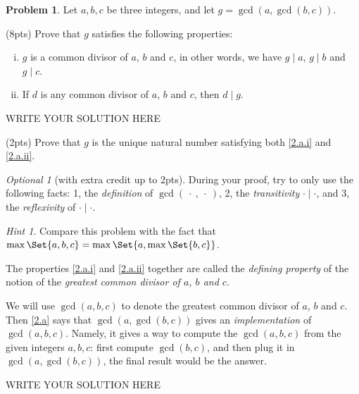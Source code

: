 \documentclass[11pt]{article}
\theoremstyle{plain}
\theoremstyle{definition}
\newtheorem{problem}{Problem}
\theoremstyle{remark}
\newtheorem*{hint}{Hint}
\newtheorem*{optional}{Optional}
\numberwithin{equation}{problem}
\begin{document}
\begin{problem}\label{p2}
	Let $a, b, c$ be three integers, and let $g=\gcd(a,\gcd(b,c))$. 
	\begin{listinprob}
		\item\label{2.a} (8pts) Prove that $g$ satisfies the following properties: 
		\begin{enumerate}[(i)]
			\item\label{2.a.i} $g$ is a common divisor of $a$, $b$ and $c$, in other words, we have $g\mid a$, $g\mid b$ and $g\mid c$. 
			\item\label{2.a.ii} If $d$ is any common divisor of $a$, $b$ and $c$, then $d\mid g$.
		\end{enumerate}

\begin{solution} %
WRITE YOUR SOLUTION HERE
\end{solution}\clearpage %

		\item\label{2.b} (2pts) 
		Prove that $g$ is the unique natural number satisfying both \ref{2.a.i} and \ref{2.a.ii}.
	\end{listinprob}
	\begin{optional}[with extra credit up to 2pts]
		During your proof, try to only use the following facts: 1, the \emph{definition} of $\gcd(\:\cdot\:,\:\cdot\:)$, 2, the \emph{transitivity} $\cdot\mid\cdot$, and 3, the \emph{reflexivity} of $\cdot\mid\cdot$. 
	\end{optional}
	\begin{hint}
		Compare this problem with the fact that $\max\Set{a,b,c} = \max\Set{a,\max\Set{b,c}}$.
	\end{hint}

	The properties \ref{2.a.i} and \ref{2.a.ii} together are called the \emph{defining property} of the notion of the \emph{greatest common divisor of $a$, $b$ and $c$}. 
	
	We will use $\gcd(a, b, c)$ to denote the greatest common divisor of $a$, $b$ and $c$. Then \cref{2.a} says that $\gcd(a,\gcd(b, c))$ gives an \emph{implementation} of $\gcd(a, b, c)$. Namely, it gives a way to compute the $\gcd(a, b, c)$ from the given integers $a,b,c$: first compute $\gcd(b, c)$, and then plug it in $\gcd(a,\gcd(b, c))$, the final result would be the answer.
\end{problem}

\begin{solution} %
WRITE YOUR SOLUTION HERE
\end{solution}\clearpage %
\end{document}
